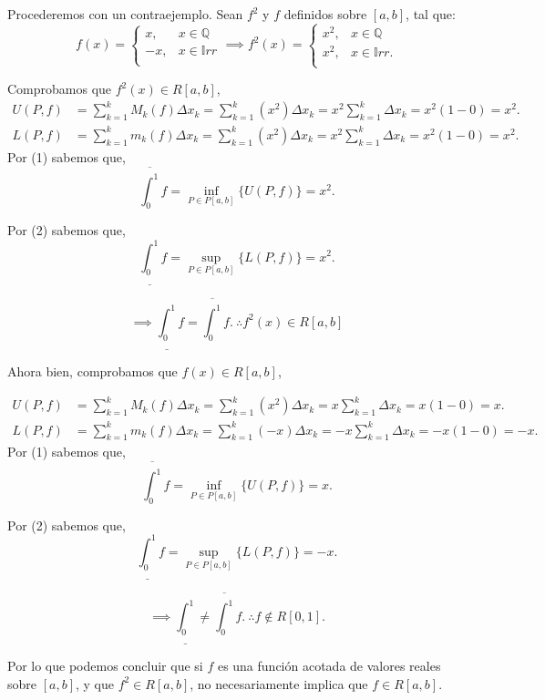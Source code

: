 \begin{sol}
	Procederemos con un contraejemplo. Sean $f^2$ y $f$ definidos sobre $[a,b]$, tal que: 
	$$f(x)=\begin{cases}
		x, & x\in \mathbb{Q}\\
		-x, & x\in \mathbb{I}rr\\
	\end{cases}\implies f^2(x)= \begin{cases}
	x^2, & x\in \mathbb{Q}\\
	x^2, & x\in \mathbb{I}rr.\\
\end{cases}$$

\linita 

Comprobamos que $f^2(x)\in R[a,b]$, 
	\begin{align}
	U(P,f) &= \sum_{k=1}^{k} M_k(f)\Delta x_k = \sum_{k=1}^{k} (x^2)\Delta x_k= x^2\sum_{k=1}^{k}\Delta x_k= x^2(1-0)= x^2.\\
	L(P,f) &= \sum_{k=1}^{k} m_k(f)\Delta x_k = \sum_{k=1}^{k} (x^2)\Delta x_k= x^2\sum_{k=1}^{k}\Delta x_k= x^2(1-0)= x^2.
\end{align}
Por (1) sabemos que, 
$$\overline{\int_0^1}f= \inf_{P\in P[a,b]}\{U(P,f)\}=x^2.$$

Por (2) sabemos que, 
$$\underline{\int_0^1}f= \sup_{P\in P[a,b]}\{L(P,f)\}=x^2.$$

$$\implies \underline{\int_0^1}f=\overline{\int_0^1}f. \ \therefore f^2(x)\in R[a,b]$$

\linita 

Ahora bien, comprobamos que $f(x)\in R[a,b]$, 


	\begin{align}
	U(P,f) &= \sum_{k=1}^{k} M_k(f)\Delta x_k = \sum_{k=1}^{k} (x^2)\Delta x_k= x\sum_{k=1}^{k}\Delta x_k= x(1-0)= x.\\
	L(P,f) &= \sum_{k=1}^{k} m_k(f)\Delta x_k = \sum_{k=1}^{k} (-x)\Delta x_k= -x\sum_{k=1}^{k}\Delta x_k= -x(1-0)= -x.
\end{align}
Por (1) sabemos que, 
$$\overline{\int_0^1}f= \inf_{P\in P[a,b]}\{U(P,f)\}=x.$$

Por (2) sabemos que, 
$$\underline{\int_0^1}f= \sup_{P\in P[a,b]}\{L(P,f)\}=-x.$$

$$\implies \underline{\int_0^1}\neq \overline{\int_0^1}f.  \ \therefore  f\not\in R[0,1].$$

\linita 

Por lo que podemos concluir que si $f$ es una función acotada de valores reales sobre $[a, b]$, y que $f^{2} \in R[a, b]$, no necesariamente implica que $f \in R[a, b]$. 

\end{sol}



%
%

